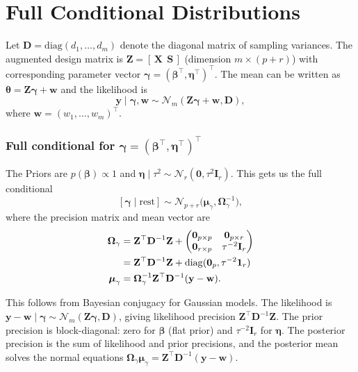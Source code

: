 \documentclass[12pt]{article}
\begin{document}
\section{Full Conditional Distributions}

Let $\mathbf{D} = \mathrm{diag}(d_1,\ldots,d_m)$ denote the diagonal matrix of sampling variances. The augmented design matrix is 
$\mathbf{Z} = [\,\mathbf{X} \ \ \mathbf{S}\,]$ (dimension $m \times (p+r)$) with corresponding parameter
vector $\boldsymbol{\gamma} = (\boldsymbol{\beta}^\top, \boldsymbol{\eta}^\top)^\top$. The mean can be written as $\boldsymbol{\theta} = \mathbf{Z}\boldsymbol{\gamma} + \mathbf{w}$ and the likelihood is 
\[
\mathbf{y} \mid \boldsymbol{\gamma}, \mathbf{w} \sim
\mathcal{N}_m(\mathbf{Z}\boldsymbol{\gamma} + \mathbf{w}, \mathbf{D}),
\]
where $\mathbf{w} = (w_1,\ldots,w_m)^\top$.

\subsubsection*{Full conditional for $\boldsymbol{\gamma} = (\boldsymbol{\beta}^\top, \boldsymbol{\eta}^\top)^\top$}

The Priors are $p(\boldsymbol{\beta}) \propto 1$ and $\boldsymbol{\eta} \mid \tau^2 \sim \mathcal{N}_r(\mathbf{0}, \tau^2 \mathbf{I}_r)$. This gets us the full conditional 
\[
[\boldsymbol{\gamma} \mid \text{rest}]
\sim \mathcal{N}_{p+r}\big( \boldsymbol{\mu}_\gamma, \boldsymbol{\Omega}_\gamma^{-1} \big),
\]
where the precision matrix and mean vector are 
\begin{align}
\boldsymbol{\Omega}_\gamma
&= \mathbf{Z}^\top \mathbf{D}^{-1} \mathbf{Z}
  + \begin{pmatrix}
      \mathbf{0}_{p \times p} & \mathbf{0}_{p \times r} \\
      \mathbf{0}_{r \times p} & \tau^{-2} \mathbf{I}_r
    \end{pmatrix}  \label{eq:omega_gamma}\\
&= \mathbf{Z}^\top \mathbf{D}^{-1} \mathbf{Z} + \mathrm{diag}(\mathbf{0}_p, \tau^{-2}\mathbf{1}_r) \notag \\
\boldsymbol{\mu}_\gamma &= \boldsymbol{\Omega}_\gamma^{-1} \mathbf{Z}^\top \mathbf{D}^{-1} (\mathbf{y} - \mathbf{w}) \label{eq:mu_gamma}.
\end{align}

This follows from Bayesian conjugacy for Gaussian models. The likelihood is $\mathbf{y} - \mathbf{w} \mid \boldsymbol{\gamma} \sim \mathcal{N}_m(\mathbf{Z}\boldsymbol{\gamma}, \mathbf{D})$, giving likelihood precision $\mathbf{Z}^\top \mathbf{D}^{-1} \mathbf{Z}$. The prior precision is block-diagonal: zero for $\boldsymbol{\beta}$ (flat prior) and $\tau^{-2}\mathbf{I}_r$ for $\boldsymbol{\eta}$. The posterior precision is the sum of likelihood and prior precisions, and the posterior mean solves the normal equations $\boldsymbol{\Omega}_\gamma \boldsymbol{\mu}_\gamma = \mathbf{Z}^\top \mathbf{D}^{-1}(\mathbf{y} - \mathbf{w})$. 
\end{document}
